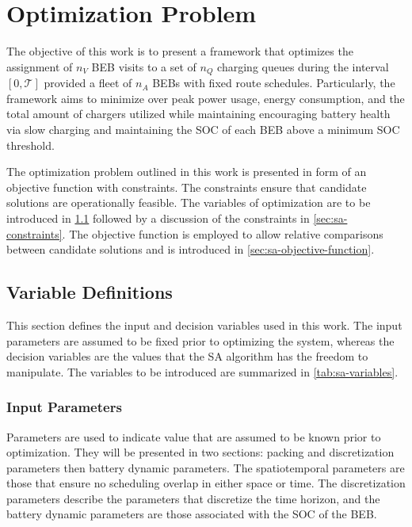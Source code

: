 \documentclass[energies,article,submit,moreauthors]{Definitions/mdpi}
\newcommand{\T}{\mathcal{T}}                %
\begin{document}
\section{Optimization Problem}
\label{sec:sa-optimization-problem}
The objective of this work is to present a framework that optimizes the assignment of \(n_V\) BEB visits to a set of \(n_Q\)
charging queues during the interval \([0,\T]\) provided a fleet of \(n_A\) BEBs with fixed route schedules. Particularly,
the framework aims to minimize over peak power usage, energy consumption, and the total amount of chargers utilized
while maintaining encouraging battery health via slow charging and maintaining the SOC of each BEB above a minimum SOC
threshold.

The optimization problem outlined in this work is presented in form of an objective function with constraints. The
constraints ensure that candidate solutions are operationally feasible. The variables of optimization are to be
introduced in \ref{sec:sa-parameter-definitions} followed by a discussion of the constraints in \ref{sec:sa-constraints}. The
objective function is employed to allow relative comparisons between candidate solutions and is introduced in
\ref{sec:sa-objective-function}.

\subsection{Variable Definitions}
\label{sec:sa-parameter-definitions}
This section defines the input and decision variables used in this work. The input parameters are assumed to be fixed
prior to optimizing the system, whereas the decision variables are the values that the SA algorithm has the freedom to
manipulate. The variables to be introduced are summarized in \ref{tab:sa-variables}.

\subsubsection{Input Parameters}
\label{sec:sa-input-variables}
Parameters are used to indicate value that are assumed to be known prior to optimization. They will be presented in two
sections: packing and discretization parameters then battery dynamic parameters. The spatiotemporal parameters are those
that ensure no scheduling overlap in either space or time. The discretization parameters describe the parameters that
discretize the time horizon, and the battery dynamic parameters are those associated with the SOC of the BEB.
\end{document}
